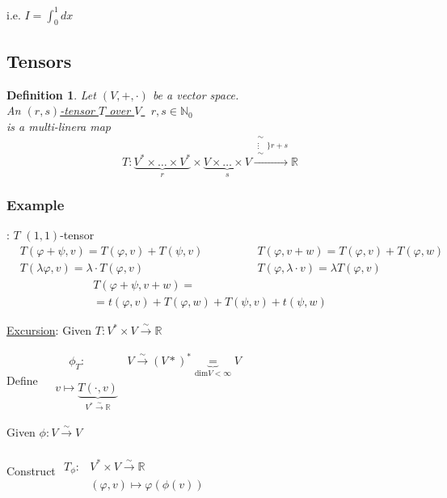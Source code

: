 \documentclass[10pt]{amsart}
\newtheorem{definition}{Definition}
\begin{document}
\begin{multicols*}{2}
i.e. $I = \int_0^1 dx$

\subsection{Tensors}

\begin{definition}
	Let $(V,+,\cdot)$ be a vector space. \\
	An \underline{ $(r,s)$-tensor $T$ over $V$ } \qquad \, $r,s \in \mathbb{N}_0 $\\
	is a multi-linera map
	\[
	T: \underbrace{ V^* \times \dots \times V^* }_r \times \underbrace{ V \times \dots \times V}_s \xrightarrow{ \substack{ \sim \\ \vdots \\ \sim } \rbrace r + s } \mathbb{R}
	\]
\end{definition}

\subsubsection{Example}: $T$ $(1,1)$-tensor
\[
\begin{aligned}
& T(\varphi + \psi, v) = T(\varphi,v) + T(\psi,v) \\ 
& T(\lambda \varphi , v) = \lambda \cdot T(\varphi,v)
\end{aligned} \qquad \qquad \begin{gathered}
T(\varphi,v+w) = T(\varphi,v) + T(\varphi,w) \\ 
T(\varphi, \lambda \cdot v) = \lambda T(\varphi, v) 
\end{gathered}
\]
\[
\begin{gathered}
T(\varphi + \psi , v+ w)  = \\
= t(\varphi,v) + T(\varphi,w) + T(\psi,v) + t(\psi,w)
\end{gathered}
\]

\underline{Excursion}:
Given $T:V^* \times V \xrightarrow{ \sim } \mathbb{R}$

Define $\begin{aligned} & \quad \ 
\phi_T: & V\xrightarrow{ \sim } (V*)^* \underbrace{=}_{\text{dim}V < \infty} V \\
& v\mapsto \underbrace{ T(\cdot , v)  }_{V^* \xrightarrow{ \sim } \mathbb{R}} \end{aligned}$

Given $\phi : V \xrightarrow{ \sim } V$

Construct $\begin{aligned} & \quad \\ 
T_{\phi} : & V^* \times V \xrightarrow{ \sim } \mathbb{R} \\
& (\varphi,v) \mapsto \varphi(\phi(v)) \end{aligned}$


\end{multicols*}
\end{document}
